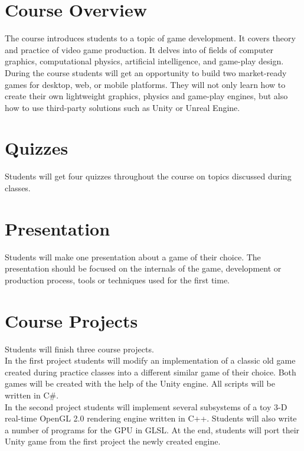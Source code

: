 \documentclass[12pt,a4paper,oneside]{article}
\begin{document}
    \section{Course Overview}

        The course introduces students to a topic of game development. It
		covers theory and practice of video game production. It delves into
		of fields of computer graphics, computational physics, artificial
		intelligence, and game-play design. During the course students will
		get an opportunity to build two market-ready games for desktop, web,
		or mobile platforms. They will not only learn how to create their own
		lightweight graphics, physics and game-play engines, but also how to
		use third-party solutions such as Unity or Unreal Engine.

    \section{Quizzes}

        Students will get four quizzes throughout the course on topics discussed
        during classes.

	\section{Presentation}

        Students will make one presentation about a game of their choice.
        The presentation should be focused on the internals of the game,
        development or production process, tools or techniques used for the
        first time.

    \section{Course Projects}

        Students will finish three course projects.\\

        In the first project students will modify an implementation of a
        classic old game created during practice classes into a different similar
        game of their choice. Both games will be created with the help of the
        Unity engine. All scripts will be written in C\#.\\

        In the second project students will implement several subsystems of
        a toy 3-D real-time OpenGL 2.0 rendering engine written in C++. Students will
        also write a number of programs for the GPU in GLSL. At the end, students will
        port their Unity game from the first project the newly created engine.\\
\end{document}
